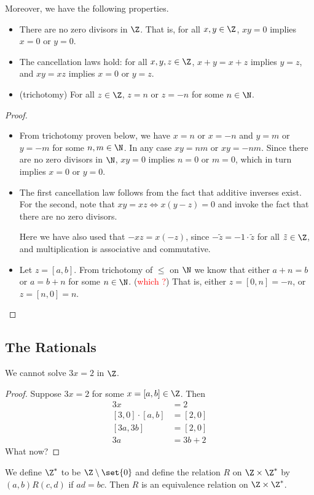 Moreover, we have the following properties.
\begin{proposition} \leavevmode
    \begin{itemize}
        \item There are no zero divisors in $\Z$.
        That is, for all $x, y \in \Z$, $xy = 0$ implies $x = 0$ or $y = 0$.
        \item The cancellation laws hold:
        for all $x, y, z \in \Z$, $x + y = x + z$ implies $y = z$,
        and $xy = xz$ implies $x = 0$ or $y = z$.
        \item (trichotomy) For all $z \in \Z$, $z = n$ or $z = -n$ for some
        $n \in \N$.
    \end{itemize}
\end{proposition}
\begin{proof}
    \begin{itemize}
        \item From trichotomy proven below, we have $x = n$ or $x = -n$ and
        $y = m$ or $y = -m$ for some $n, m \in \N$.
        In any case $xy = nm$ or $xy = -nm$.
        Since there are no zero divisors in $\N$, $xy = 0$ implies $n = 0$ or
        $m = 0$, which in turn implies $x = 0$ or $y = 0$.
        \item The first cancellation law follows from the fact that additive
        inverses exist.
        For the second, note that $xy = xz \iff x(y - z) = 0$ and invoke the
        fact that there are no zero divisors.

        Here we have also used that $-xz = x(-z)$, since
        $-\tilde{z} = -1 \cdot \tilde{z}$ for all $\tilde{z} \in \Z$, and
        multiplication is associative and commutative.
        \item Let $z = [a, b]$.
        From trichotomy of $\le$ on $\N$ we know that either $a + n = b$ or
        $a = b + n$ for some $n \in \N$. (\textcolor{Red}{which \N?})
        That is, either $z = [0, n] = -n$, or $z = [n, 0] = n$.
    \end{itemize}
\end{proof}

\subsection{The Rationals} \label{sec:rationals}
We cannot solve $3x = 2$ in $\Z$.
\begin{proof}
    Suppose $3x = 2$ for some $x = [a, b] \in \Z$.
    Then \begin{align*}
        3x &= 2 \\
        [3, 0] \cdot [a, b] &= [2, 0] \\
        [3a, 3b] &= [2, 0] \\
        3a &= 3b + 2
    \end{align*}
    What now?
\end{proof}
We define $\Z^*$ to be $\Z \setminus \set{0}$ and define the relation $R$ on
$\Z \times \Z^*$ by $(a, b) R (c, d)$ if $ad = bc$.
Then $R$ is an equivalence relation on $\Z \times \Z^*$.

